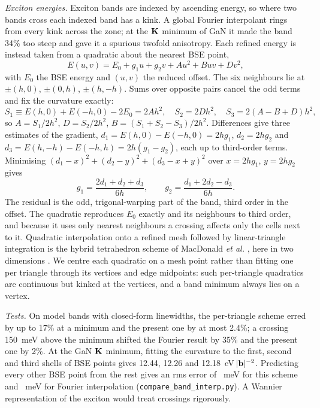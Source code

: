 \emph{Exciton energies.} Exciton bands are indexed by ascending energy, so where
two bands cross each indexed band has a kink. A global Fourier interpolant
\cite{Koelling1986,Pickett1988} rings from every kink across the zone; at the
$\mathbf{K}$ minimum of GaN it made the band 34\% too steep and gave it a spurious
twofold anisotropy. Each refined energy is instead taken from a quadratic about
the nearest BSE point,
\begin{equation}
E(u,v)=E_0+g_1u+g_2v+Au^2+Buv+Dv^2,
\end{equation}
with $E_0$ the BSE energy and $(u,v)$ the reduced offset. The six neighbours lie
at $\pm(h,0)$, $\pm(0,h)$, $\pm(h,-h)$. Sums over opposite pairs cancel the odd
terms and fix the curvature exactly:
\begin{equation}
S_1\equiv E(h,0)+E(-h,0)-2E_0=2Ah^2,\quad S_2=2Dh^2,\quad S_3=2(A-B+D)h^2,
\end{equation}
so $A=S_1/2h^2$, $D=S_2/2h^2$, $B=(S_1+S_2-S_3)/2h^2$. Differences give three
estimates of the gradient, $d_1=E(h,0)-E(-h,0)=2hg_1$, $d_2=2hg_2$ and
$d_3=E(h,-h)-E(-h,h)=2h(g_1-g_2)$, each up to third-order terms. Minimising
$(d_1-x)^2+(d_2-y)^2+(d_3-x+y)^2$ over $x=2hg_1$, $y=2hg_2$ gives
\begin{equation}
g_1=\frac{2d_1+d_2+d_3}{6h},\qquad g_2=\frac{d_1+2d_2-d_3}{6h}.
\end{equation}
The residual is the odd, trigonal-warping part of the band, third order in the
offset. The quadratic reproduces $E_0$ exactly and its neighbours to third
order, and because it uses only nearest neighbours a crossing affects only the
cells next to it. Quadratic interpolation onto a refined mesh followed by
linear-triangle integration is the hybrid tetrahedron scheme of MacDonald
\emph{et al.} \cite{MacDonald1979,Dong2025}, here in two dimensions
\cite{Wiesenekker1988}. We centre each quadratic on a mesh point rather than
fitting one per triangle through its vertices and edge midpoints: such
per-triangle quadratics are continuous but kinked at the vertices, and a band
minimum always lies on a vertex.

\emph{Tests.} On model bands with closed-form linewidths, the per-triangle
scheme erred by up to 17\% at a minimum and the present one by at most 2.4\%; a
crossing 150~meV above the minimum shifted the Fourier result by 35\% and the
present one by 2\%. At the GaN $\mathbf{K}$ minimum, fitting the curvature to the
first, second and third shells of BSE points gives 12.44, 12.26 and
12.18~eV$\,|\mathbf{b}|^{-2}$. Predicting every other BSE point from the rest gives an rms
error of ~meV for this scheme and ~meV for Fourier interpolation
(\texttt{compare\_band\_interp.py}). A Wannier representation of the exciton
\cite{Haber2023} would treat crossings rigorously.

